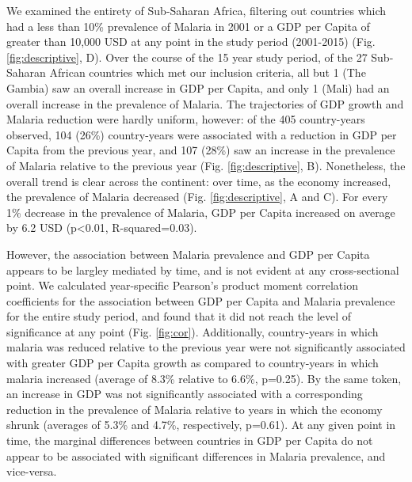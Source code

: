 \documentclass[9pt,twocolumn,twoside,lineno]{pnas-new}
\begin{document}
We examined the entirety of Sub-Saharan Africa, filtering out countries which had a less than 10\% prevalence of Malaria in 2001 or a GDP per Capita of greater than 10,000 USD at any point in the study period (2001-2015) (Fig. \ref{fig:descriptive}, D). Over the course of the 15 year study period, of the 27 Sub-Saharan African countries which met our inclusion criteria, all but 1 (The Gambia) saw an overall increase in GDP per Capita, and only 1 (Mali) had an overall increase in the prevalence of Malaria. The trajectories of GDP growth and Malaria reduction were hardly uniform, however: of the 405 country-years observed, 104 (26\%) country-years were associated with a reduction in GDP per Capita from the previous year, and 107 (28\%) saw an increase in the prevalence of Malaria relative to the previous year  (Fig. \ref{fig:descriptive}, B). Nonetheless, the overall trend is clear across the continent: over time, as the economy increased, the prevalence of Malaria decreased (Fig. \ref{fig:descriptive}, A and C). For every 1\% decrease in the prevalence of Malaria, GDP per Capita increased on average by 6.2 USD (p<0.01, R-squared=0.03).

However, the association between Malaria prevalence and GDP per Capita appears to be largley mediated by time, and is not evident at any cross-sectional point. We calculated year-specific Pearson's product moment correlation coefficients for the association between GDP per Capita and Malaria prevalence for the entire study period, and found that it did not reach the level of significance at any point (Fig. \ref{fig:cor}). Additionally, country-years in which malaria was reduced relative to the previous year were not significantly associated with greater GDP per Capita growth as compared to country-years in which malaria increased (average of 8.3\% relative to 6.6\%, p=0.25). By the same token, an increase in GDP was not significantly associated with a corresponding reduction in the prevalence of Malaria relative to years in which the economy shrunk (averages of 5.3\% and 4.7\%, respectively, p=0.61). At any given point in time, the marginal differences between countries in GDP per Capita do not appear to be associated with significant differences in Malaria prevalence, and vice-versa.
\end{document}
